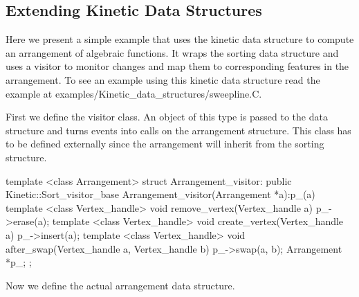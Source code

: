 

\subsection{Extending Kinetic Data Structures\label{sec:kds_sweepline_example}}


Here we present a simple example that uses the
 kinetic data structure to compute
an arrangement of algebraic functions. It wraps the sorting data
structure and uses a visitor to monitor changes and map them to
corresponding features in the arrangement. To see an example using
this kinetic data structure read the example at
examples/Kinetic\_data\_structures/sweepline.C.

First we define the visitor class. An object of this type is passed to
the  data structure and turns
events into calls on the arrangement structure. This class has to be
defined externally since the arrangement will inherit from the sorting
structure.

\begin{ccExampleCode}
template <class Arrangement>
struct Arrangement_visitor: public Kinetic::Sort_visitor_base
{
  Arrangement_visitor(Arrangement *a):p_(a){}
  template <class Vertex_handle>
  void remove_vertex(Vertex_handle a) {
    p_->erase(a);
  }
  template <class Vertex_handle>
  void create_vertex(Vertex_handle a) {
    p_->insert(a);
  }
  template <class Vertex_handle>
  void after_swap(Vertex_handle a, Vertex_handle b) {
    p_->swap(a, b);
  }
  Arrangement *p_;
};

\end{ccExampleCode}

Now we define the actual arrangement data structure. 

